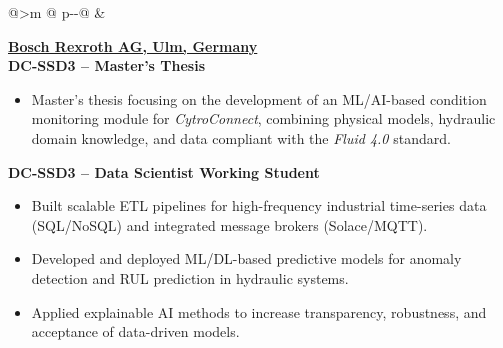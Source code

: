 \begin{tabular}{@{}>{\raggedleft\arraybackslash}m{\datecol} @{\hspace{\colgap}} p{\dimexpr\textwidth-\datecol-\colgap\relax}@{}}
 &
\begin{minipage}[t]{\linewidth}\vspace{0pt}
\begin{expblock}
  \footnotesize
  \setlength{\parindent}{0pt}\setlength{\parskip}{0pt}
  \textbf{\href{https://www.boschrexroth.com/en/dc/}{Bosch Rexroth AG, Ulm, Germany}}\\[-0.1em]
  \textbf{DC-SSD3 – Master's Thesis }\\[-1em]
    \begin{itemize}[nosep,leftmargin=1em]
    \item Master's thesis focusing on the development of an ML/AI-based condition monitoring module for \emph{CytroConnect}, combining physical models, hydraulic domain knowledge, and data compliant with the \emph{Fluid 4.0} standard.
    \end{itemize}
  \textbf{DC-SSD3 – Data Scientist Working Student}\\[-1em]
  \begin{itemize}[nosep,leftmargin=1em]
\item Built scalable ETL pipelines for high-frequency industrial time-series data (SQL/NoSQL) and integrated message brokers (Solace/MQTT).
\item Developed and deployed ML/DL-based predictive models for anomaly detection and RUL prediction in hydraulic systems.
\item Applied explainable AI methods to increase transparency, robustness, and acceptance of data-driven models.

  \end{itemize}
\end{expblock}
\end{minipage}
\\[-0.2em]



\end{tabular}
